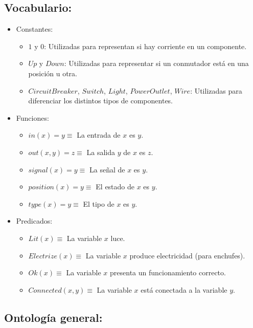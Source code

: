 \documentclass[10pt, a4paper,spanish]{article}
\begin{document}
		\subsection{Vocabulario:}
			\begin{itemize}
				\item Constantes:
				\begin{itemize}
					\item $1$ y $0$: Utilizadas para  representan si hay corriente en un componente.
					\item $Up$ y $Down$: Utilizadas para representar si un conmutador está en una posición u otra.
					\item $CircuitBreaker$, $Switch$, $Light$, $PowerOutlet$, $Wire$: Utilizadas para diferenciar los distintos tipos de componentes.
				\end{itemize}
				\item Funciones:
				\begin{itemize}
					\item $in(x) = y \equiv$ La entrada de $x$ es $y$.
					\item $out(x,y) = z \equiv$ La salida $y$ de $x$ es  $z$.
					\item $signal(x) = y \equiv$ La señal de $x$ es  $y $.
					\item $position(x) = y \equiv$ El estado de $x$ es $y$.
					\item $type(x) = y \equiv$ El tipo de $x$ es $y$.
				\end{itemize}
				\item Predicados:
				\begin{itemize}
					\item $Lit(x) \equiv$ La variable $x$ luce.
					\item $Electrize(x) \equiv$ La variable $x$ produce electricidad (para enchufes).
					\item $Ok(x) \equiv$ La variable $x$ presenta un funcionamiento correcto.
					\item $Connected(x, y) \equiv$ La variable $x$ está conectada a la variable $y$.
				\end{itemize}
			\end{itemize}

		\subsection{Ontología general:}
\end{document}
